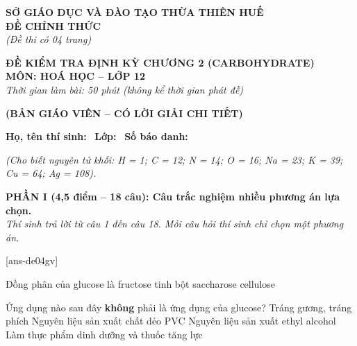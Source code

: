 \documentclass[12pt,a4paper]{article}
\begin{document}
\thispagestyle{firstpage}

\noindent
\begin{minipage}[t]{0.44\textwidth}
	\centering\fontsize{10pt}{12pt}\selectfont
	\textbf{SỞ GIÁO DỤC VÀ ĐÀO TẠO THỪA THIÊN HUẾ}\\
	\textbf{ĐỀ CHÍNH THỨC}\\
	\textit{(Đề thi có 04 trang)}
\end{minipage}\hfill
\begin{minipage}[t]{0.54\textwidth}
	\centering\small
	\textbf{ĐỀ KIỂM TRA ĐỊNH KỲ CHƯƠNG 2 (CARBOHYDRATE)}\\
	\textbf{MÔN: HOÁ HỌC -- LỚP 12}\\
	\textit{Thời gian làm bài: 50 phút (không kể thời gian phát đề)}\\
\end{minipage}

\smallskip
\begin{center}
	{\color{hfRed}\textbf{\large (BẢN GIÁO VIÊN -- CÓ LỜI GIẢI CHI TIẾT)}}
\end{center}

\smallskip
\noindent\hrulefill
\smallskip

\noindent\textbf{Họ, tên thí sinh:} \dotfill\ \textbf{Lớp:} \dotfill\ \textbf{Số báo danh:} \dotfill

\smallskip
\noindent\textit{(Cho biết nguyên tử khối: H = 1; C = 12; N = 14; O = 16; Na = 23; K = 39; Cu = 64; Ag = 108).}

\vspace{0.2cm}
\noindent
\textbf{PHẦN I (4,5 điểm -- 18 câu): Câu trắc nghiệm nhiều phương án lựa chọn.}\\
\textit{Thí sinh trả lời từ câu 1 đến câu 18. Mỗi câu hỏi thí sinh chỉ chọn một phương án.}

[ans-de04gv]

\begin{ex}
Đồng phân của glucose là
\choice
{\True fructose}
{tinh bột}
{saccharose}
{cellulose}
\end{ex}

\begin{ex}
Ứng dụng nào sau đây \textbf{không} phải là ứng dụng của glucose?
\choice
{Tráng gương, tráng phích}
{\True Nguyên liệu sản xuất chất dẻo PVC}
{Nguyên liệu sản xuất ethyl alcohol}
{Làm thực phẩm dinh dưỡng và thuốc tăng lực}
\end{ex}
\end{document}
